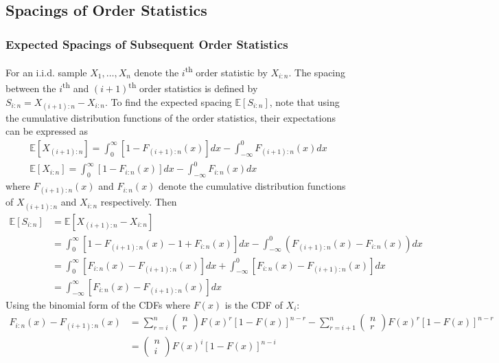 \documentclass[11pt]{report} %
\begin{document}
\subsection{Spacings of Order Statistics}

\subsubsection{Expected Spacings of Subsequent Order Statistics}

For an i.i.d. sample $X_{1}, \dots, X_{n}$ denote the $i$\textsuperscript{th} order statistic by $X_{i:n}$. The spacing between the $i$\textsuperscript{th} and $\left(i + 1\right)$\textsuperscript{th} order statistics is defined by $S_{i:n} = X_{\left(i + 1\right):n} - X_{i:n}$. To find the expected spacing $\mathbb{E}\left[S_{i:n}\right]$, note that using the cumulative distribution functions of the order statistics, their expectations can be expressed as
\begin{gather}
\mathbb{E}\left[X_{\left(i+1\right):n}\right]=\int_{0}^{\infty}\left[1-F_{\left(i+1\right):n}\left(x\right)\right]dx-\int_{-\infty}^{0}F_{\left(i+1\right):n}\left(x\right)dx \\
\mathbb{E}\left[X_{i:n}\right]=\int_{0}^{\infty}\left[1-F_{i:n}\left(x\right)\right]dx-\int_{-\infty}^{0}F_{i:n}\left(x\right)dx
\end{gather}
where $F_{\left(i+1\right):n}\left(x\right)$ and $F_{i:n}\left(x\right)$ denote the cumulative distribution functions of $X_{\left(i+1\right):n}$ and $X_{i:n}$ respectively. Then
\begin{align}
\mathbb{E}\left[S_{i:n}\right] &= \mathbb{E}\left[X_{\left(i+1\right):n}-X_{i:n}\right] \\
&= \int_{0}^{\infty}\left[1-F_{\left(i+1\right):n}\left(x\right)-1+F_{i:n}\left(x\right)\right]dx-\int_{-\infty}^{0}\left(F_{\left(i+1\right):n}\left(x\right)-F_{i:n}\left(x\right)\right)dx \\
&= \int_{0}^{\infty}\left[F_{i:n}\left(x\right)-F_{\left(i+1\right):n}\left(x\right)\right]dx+\int_{-\infty}^{0}\left[F_{i:n}\left(x\right)-F_{\left(i+1\right):n}\left(x\right)\right]dx \\
&= \int_{-\infty}^{\infty}\left[F_{i:n}\left(x\right)-F_{\left(i+1\right):n}\left(x\right)\right]dx
\end{align}
Using the binomial form of the CDFs where $F\left(x\right)$ is the CDF of $X_{i}$:
\begin{align}
F_{i:n}\left(x\right)-F_{\left(i+1\right):n}\left(x\right) &= \sum_{r=i}^{n}\begin{pmatrix}n\\r\end{pmatrix}F\left(x\right)^{r}\left[1-F\left(x\right)\right]^{n-r}-\sum_{r=i+1}^{n}\begin{pmatrix}n\\r\end{pmatrix}F\left(x\right)^{r}\left[1-F\left(x\right)\right]^{n-r} \\
&= \begin{pmatrix}n\\i\end{pmatrix}F\left(x\right)^{i}\left[1-F\left(x\right)\right]^{n-i}
\end{align}
\end{document}
